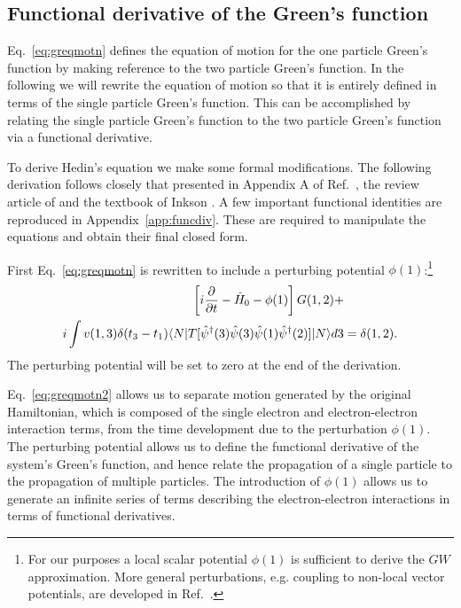 \subsection{Functional derivative of the Green's function}
\noindent
Eq.~\ref{eq:greqmotn} defines the equation of motion for the one particle Green's
function by making reference to the two particle Green's function.
In the following we will rewrite the equation of motion so that it is entirely defined in
terms of the single particle Green's function. This can be
accomplished by relating the single particle Green's function to the two particle Green's
function via a functional derivative.

To derive Hedin's equation we make some formal modifications. The following derivation follows closely
that presented in Appendix A of Ref.~\cite{hedin65}, the review article of \cite{strinati88} 
and the textbook of Inkson \cite{inkson}. A few important functional identities 
are reproduced in Appendix~\ref{app:funcdiv}. These are required to manipulate the equations 
and obtain their final closed form.

First Eq.~\ref{eq:greqmotn} is rewritten to include a perturbing potential $\phi(1)$:\footnote{For our
purposes a local scalar potential $\phi(1)$ is sufficient to derive the $GW$ approximation. More general 
perturbations, e.g. coupling to non-local vector potentials, are developed in Ref.~\cite{strinati88}.}
%
\begin{align}
\label{eq:greqmotn2}
\left[i\frac{\partial}{\partial t} - \hat{H}_{0} - \phi(1)\right]G(1,2) +& \nonumber \\
i\int v(1,3)\delta(t_{3}-t_{1})\langle N| T[\hat{\psi}^{\dagger}(3)\hat{\psi}(3)\hat{\psi}(1)\hat{\psi}^{\dagger}(2)] |N \rangle d3 &= \delta(1,2).
\end{align}
%
The perturbing potential will be set to zero at the end of the derivation.

Eq.~\ref{eq:greqmotn2} allows us to separate motion generated by the original Hamiltonian, 
which is composed of the single electron and electron-electron
interaction terms, from the time development due to the perturbation $\phi(1)$. The perturbing potential 
allows us to define the functional derivative of the system's Green's
function, and hence relate the propagation of a single particle to the propagation of multiple particles. 
The introduction of $\phi(1)$ allows us to generate an infinite series of terms 
describing the electron-electron interactions in terms of functional derivatives.

